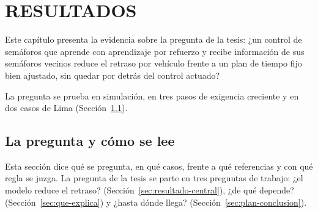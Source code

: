\chapter{RESULTADOS}
\label{cap:resultados}


Este capítulo presenta la evidencia sobre la pregunta de la tesis:
¿un control de semáforos que aprende con aprendizaje por refuerzo y
recibe información de sus semáforos vecinos reduce el retraso por
vehículo frente a un plan de tiempo fijo bien ajustado, sin quedar por
detrás del control actuado?

La pregunta se prueba en simulación, en tres pasos de exigencia
creciente y en dos casos de Lima (Sección~\ref{sec:plan-resultados}).

\section{La pregunta y cómo se lee}
\label{sec:plan-resultados}

Esta sección dice qué se pregunta, en qué casos, frente a qué
referencias y con qué regla se juzga. La pregunta de la tesis se parte
en tres preguntas de trabajo: ¿el modelo reduce el retraso?
(Sección~\ref{sec:resultado-central}), ¿de qué depende?
(Sección~\ref{sec:que-explica}) y ¿hasta dónde llega?
(Sección~\ref{sec:plan-conclusion}).

